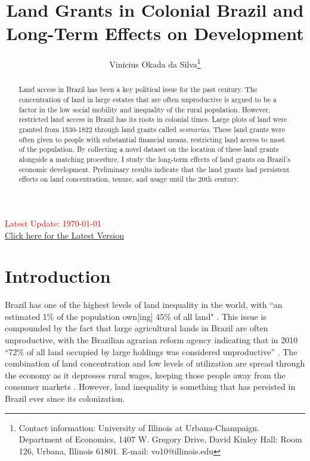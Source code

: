 \documentclass{article}
\title{Land Grants in Colonial Brazil and Long-Term Effects on Development}
\author{Vinicius Okada da Silva\thanks{Contact information: University of Illinois at Urbana-Champaign. Department of Economics, 1407 W. Gregory Drive, David Kinley Hall: Room 126, Urbana, Illinois 61801. E-mail: vo10@illinois.edu}}
\affil{Department of Economics, University of Illinois at Urbana-Champaign}
\date{}
\begin{document}
\maketitle
\thispagestyle{empty} 

\vspace{-.1cm}
\begin{center}
  \textcolor{red}{Latest Update: \today}
  \\
  \href{https://viniokadasilva.github.io/Papers/Sesmarias/02.Draft/02.Second_Draft/Sesmarias_Paper.pdf}{Click here for the Latest Version}
\end{center}
\vspace{.1cm}

\begin{abstract}
  Land access in Brazil has been a key political issue for the past century. The concentration of land in large estates that are often unproductive is argued to be a factor in the low social mobility and inequality of the rural population. However, restricted land access in Brazil has its roots in colonial times. Large plots of land were granted from 1530-1822 through land grants called \textit{sesmarias}. These land grants were often given to people with substantial financial means, restricting land access to most of the population. By collecting a novel dataset on the location of these land grants alongside a matching procedure, I study the long-term effects of land grants on Brazil's economic development. Preliminary results indicate that the land grants had persistent effects on land concentration, tenure, and usage until the 20th century.
\end{abstract}

\clearpage
{} 

\section{Introduction}

Brazil has one of the highest levels of land inequality in the world, with ``an estimated 1\% of the population own[ing] 45\% of all land" \parencite{Usaid2016-xs}. 
This issue is compounded by the fact that large agricultural lands in Brazil are often unproductive, with the Brazilian agrarian reform agency indicating that in 2010 ``72\% of all land occupied by large holdings was considered unproductive'' \parencite{Carlson2019-mk}.
The combination of land concentration and low levels of utilization are spread through the economy as it depresses rural wages, keeping those people away from the consumer markets \parencite[p.~1]{De_Oliveira_Andrade1980-xz}.
However, land inequality is something that has persisted in Brazil ever since its colonization.
\end{document}
